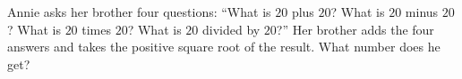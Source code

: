 Annie asks her brother four questions: ``What is $20$ plus $20$? What is $20$ minus $20$? What is $20$ times $20$? What is $20$ divided by $20$?'' Her brother adds the four answers and takes the positive square root of the result. What number does he get?
